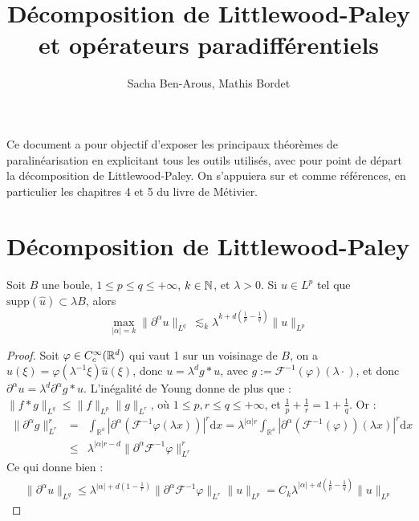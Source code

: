 \documentclass[11pt,a4paper]{article}
\title{\textbf{Décomposition de Littlewood-Paley et opérateurs paradifférentiels}}
\date{}
\author{Sacha Ben-Arous, Mathis Bordet}
\begin{document}
\maketitle

Ce document a pour objectif d'exposer les principaux théorèmes de paralinéarisation en explicitant tous les outils utilisés, avec pour point de départ la décomposition de Littlewood-Paley. On s'appuiera sur \cite{metivier} et \cite{dgv} comme références, en particulier les chapitres 4 et 5 du livre de Métivier.
\section{Décomposition de Littlewood-Paley}


\begin{thm}
Soit $B$ une boule, $1\leq p  \leq  q \leq +\infty$, $k\in \mathbb N$, et $\lambda >0$. Si $u\in L^p$ tel que $\text{supp}(\hat{u})\subset \lambda B$, alors
\begin{equation}\label{bernstein}
\max_{|\alpha|=k}{\| \partial^\alpha u\|_{L^q}} \ \lesssim_k \lambda^{k+d \left ( \frac{1}{p}- \frac{1}{q} \right )}\|u\|_{L^p}
\end{equation}
\end{thm}

\begin{proof}
Soit $\varphi \in C^\infty_c(\mathbb R^d)$ qui vaut 1 sur un voisinage de $B$, on a $\hat{u}(\xi)=\varphi(\lambda^{-1}\xi)\hat{u}(\xi)$, donc $u=\lambda^d g * u$, avec $g := \mathcal{F}^{-1}(\varphi)(\lambda \cdot)$, et donc $\partial^\alpha u =\lambda^d \partial^\alpha g * u$. L'inégalité de Young donne de plus que : $\|f * g \|_{L^q} \leq \|f\|_{L^p} \|g\|_{L^r}$, où $1\leq p,r\leq q \leq +\infty$, et $\frac{1}{p}+\frac{1}{r}= 1 + \frac{1}{q}$. Or :
\begin{eqnarray*}
\| \partial^\alpha g \|^r_{L^r} &=& \int_{\mathbb{R^d}} \left | \partial^\alpha \left(\mathcal{F}^{-1} \varphi(\lambda x)\right) \right |^r \mathrm{d}x =   \lambda^{|\alpha|r} \int_{\mathbb{R^d}} \left | \partial^\alpha \left(\mathcal{F}^{-1}(\varphi)\right)(\lambda x) \right |^r \mathrm{d}x  \\
&\leq& \lambda^{|\alpha|r-d} \| \partial^\alpha \mathcal{F}^{-1}\varphi \|^r_{L^r}
\end{eqnarray*}
Ce qui donne bien :
\begin{eqnarray*}
\| \partial^\alpha u \|_{L^q} \leq \lambda^{|\alpha| + d(1-\frac{1}{r})} \| \partial^\alpha \mathcal{F}^{-1}\varphi \|_{L^r} \|u\|_{L^p} = C_k\lambda^{|\alpha| + d(\frac{1}{p}-\frac{1}{q})} \|u\|_{L^p}
\end{eqnarray*}
\end{proof}
\end{document}
